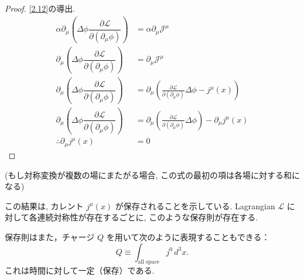 \documentclass[a4paper,12pt]{article}
\begin{document}
\color{blue}

\begin{proof}
\eqref{2.12}の導出.\\
\begin{align*}
    \alpha \partial_\mu \left( \Delta\phi \dfrac{\partial \mathcal{L}}{\partial(\partial_\mu \phi)}\right) &= \alpha \partial_\mu \mathcal{J}^\mu \tag{2-2.e1}\\
    \partial_\mu \left( \Delta\phi \dfrac{\partial \mathcal{L}}{\partial(\partial_\mu \phi)}\right) &= \partial_\mu \mathcal{J}^\mu \tag{2-2.e2}\\
    \partial_\mu \left( \Delta\phi \dfrac{\partial \mathcal{L}}{\partial(\partial_\mu \phi)}\right) &= \partial_\mu \left( \frac{\partial \mathcal{L}}{\partial(\partial_\mu \phi)} \Delta \phi - j^\mu(x) \right) \tag{2-2.e3}\\
    \partial_\mu \left( \Delta\phi \dfrac{\partial \mathcal{L}}{\partial(\partial_\mu \phi)}\right) &= \partial_\mu \left( \frac{\partial \mathcal{L}}{\partial(\partial_\mu \phi)} \Delta \phi \right) - \partial_\mu j^\mu(x) \tag{2-2.e4}\\
    \therefore \partial_\mu j^\mu(x) &= 0 \tag{2-2.e5}
\end{align*}

\end{proof}

\color{black}

\noindent (もし対称変換が複数の場にまたがる場合, この式の最初の項は各場に対する和になる)

この結果は, カレント $j^\mu(x)$ が保存されることを示している. Lagrangian $\mathcal{L}$ に対して各連続対称性が存在するごとに, このような保存則が存在する.

保存則はまた，チャージ $Q$ を用いて次のように表現することもできる：
\begin{equation}\label{2.13}
Q \equiv \int_{\text{all space}} j^0 \, d^3x.
\tag{2.13}
\end{equation}
これは時間に対して一定（保存）である.

\color{blue}
\end{document}
